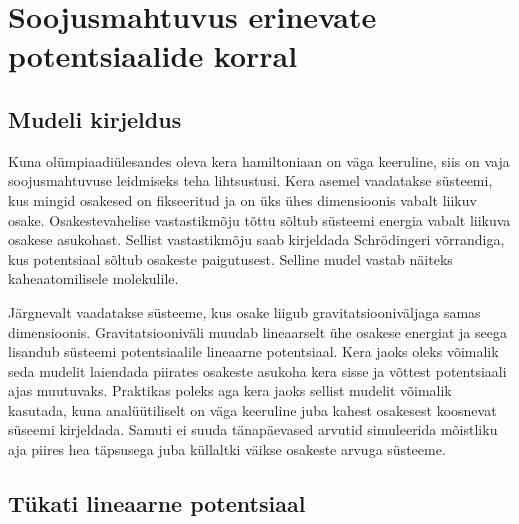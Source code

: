\documentclass{trkut}%
\begin{document}

\chapter{Soojusmahtuvus erinevate potentsiaalide korral}

\section{Mudeli kirjeldus}

Kuna olümpiaadiülesandes oleva kera hamiltoniaan on väga keeruline, siis on vaja soojusmahtuvuse leidmiseks teha lihtsustusi.
Kera asemel vaadatakse süsteemi, kus mingid osakesed on fikseeritud ja on üks ühes dimensioonis vabalt liikuv osake.
Osakestevahelise vastastikmõju tõttu sõltub süsteemi energia vabalt liikuva osakese asukohast.
Sellist vastastikmõju saab kirjeldada Schrödingeri võrrandiga, kus potentsiaal sõltub osakeste paigutusest.
Selline mudel vastab näiteks kaheaatomilisele molekulile.

Järgnevalt vaadatakse süsteeme, kus osake liigub gravitatsiooniväljaga samas dimensioonis.
Gravitatsiooniväli muudab lineaarselt ühe osakese energiat ja seega lisandub süsteemi potentsiaalile lineaarne potentsiaal.
Kera jaoks oleks võimalik seda mudelit laiendada piirates osakeste asukoha kera sisse ja võttest potentsiaali ajas muutuvaks.
Praktikas poleks aga kera jaoks sellist mudelit võimalik kasutada, kuna analüütiliselt on väga keeruline juba kahest osakesest koosnevat süseemi kirjeldada.
Samuti ei suuda tänapäevased arvutid simuleerida mõistliku aja piires hea täpsusega juba küllaltki väikse osakeste arvuga süsteeme.

\section{Tükati lineaarne potentsiaal}
\end{document}
